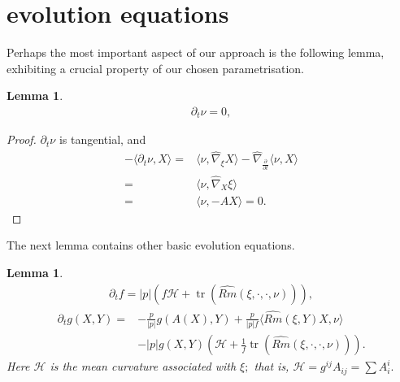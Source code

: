 \documentclass{amsart}
\newtheorem{lemma}[theorem]{Lemma}
\theoremstyle{definition}
\theoremstyle{remark}
\numberwithin{equation}{section}
\begin{document}
\section{evolution equations}

Perhaps the most important aspect of our approach is the following lemma, exhibiting a crucial property of our chosen parametrisation.

\begin{lemma}
\begin{align}
\partial_t\nu=0,
\end{align}
\end{lemma}

\begin{proof}
$\partial_t \nu$ is tangential, and
\begin{align*}
-\langle \partial_t\nu,X\rangle=&\langle \nu,\hat{\nabla}_{\xi}X\rangle-\hat{\nabla}_{\frac{\partial}{\partial t}}\langle \nu,X \rangle \\
=&\langle \nu,\hat{\nabla}_{X}\xi\rangle\\
=&\langle \nu,-AX\rangle=0.
\end{align*}
\end{proof}

The next lemma contains other basic evolution equations.
\begin{lemma}
\begin{align}
\partial_t f = |p|(f\mathcal{H}+\operatorname{tr} (\widehat{Rm}(\xi,\cdot,\cdot,\nu))),
\end{align}
\begin{align}
\partial_tg(X,Y)=&-\frac{p}{|p|}g(A(X),Y)+\frac{p}{|p|f}\langle \widehat{Rm}(\xi,Y)X,\nu\rangle\\
&-
|p|g(X,Y)(\mathcal{H}+\frac{1}{f}\operatorname{tr} (\widehat{Rm}(\xi,\cdot,\cdot,\nu))).\nonumber
\end{align}
Here $\mathcal{H}$ is the mean curvature associated with $\xi;$ that is, $\mathcal{H}=g^{ij} A _{ij}=\sum  A _i^i.$
\end{lemma}
\end{document}
